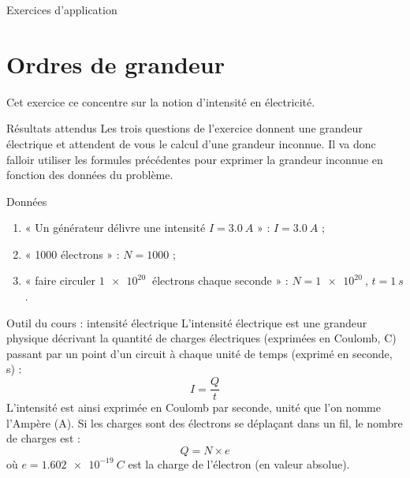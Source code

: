 \documentclass[10pt,a5paper,notitlepage]{book}
\begin{document}
\begin{center}
    \Huge Exercices d'application
\end{center}

\section{Ordres de grandeur}

Cet exercice ce concentre sur la notion d'intensité en électricité.

\begin{NCprop}{Résultats attendus}
    Les trois questions de l'exercice donnent une grandeur électrique et
    attendent de vous le calcul d'une grandeur inconnue. Il va donc falloir
    utiliser les formules précédentes pour exprimer la grandeur inconnue en
    fonction des données du problème.
\end{NCprop}

\begin{NCdefi}{Données}
	\begin{enumerate}
        \item « Un générateur délivre une intensité $I = \SI{3.0}{A}$ » :
            $I = \SI{3.0}{A}$ ;
		\item « 1000 électrons » : $N = 1000$ ;
        \item « faire circuler $\SI{1e20}{}$ électrons chaque seconde » : $N =
            \SI{1e20}{}$, $t = \SI{1}{s}$.
	\end{enumerate}
\end{NCdefi}

\begin{NCdemo}{Outil du cours : intensité électrique}
    L'intensité électrique est une grandeur physique décrivant la quantité de
    charges électriques (exprimées en Coulomb, C) passant par un point d'un
    circuit à chaque unité de temps (exprimé en seconde, s) :
	\begin{equation}
		I = \dfrac{Q}{t} \label{eq:1.1.intensite}
	\end{equation}
    L'intensité est ainsi exprimée en Coulomb par seconde, unité que l'on nomme
    l'Ampère (A). Si les charges sont des électrons se déplaçant dans un fil, le
    nombre de charges est :
	\begin{equation}
		Q = N\times e \label{eq:1.1.charge}
	\end{equation}
    où $e = \SI{1.602e-19}{C}$ est la charge de l'électron (en valeur
    absolue).
\end{NCdemo}
\end{document}
